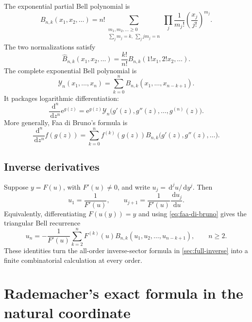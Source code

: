\documentclass[11pt]{article}
\numberwithin{equation}{section}
\theoremstyle{mainthm}
\theoremstyle{defstyle}
\theoremstyle{remark}
\newcommand{\e}{\mathrm e}
\newcommand{\dd}{\,\mathrm d}
\newcommand{\Ybell}{\mathcal Y}
\begin{document}
The exponential partial Bell polynomial is
\begin{equation}\label{eq:exp-bell-def}
 B_{n,k}(x_1,x_2,\ldots)=
 n!\sum_{\substack{m_1,m_2,\ldots\ge0\\
                 \sum_jm_j=k,\ \sum_jjm_j=n}}
 \prod_j\frac1{m_j!}\left(\frac{x_j}{j!}\right)^{m_j}.
\end{equation}
The two normalizations satisfy
\begin{equation}\label{eq:bell-normalization-relation}
 \widehat B_{n,k}(x_1,x_2,\ldots)
 =\frac{k!}{n!}B_{n,k}(1!x_1,2!x_2,\ldots).
\end{equation}
The complete exponential Bell polynomial is
\begin{equation}\label{eq:complete-bell}
 \Ybell_n(x_1,\ldots,x_n)=\sum_{k=0}^{n}B_{n,k}(x_1,\ldots,x_{n-k+1}).
\end{equation}
It packages logarithmic differentiation:
\begin{equation}\label{eq:exp-derivative-bell}
 \frac{\dd^n}{\dd z^n}\e^{g(z)}
 =\e^{g(z)}\Ybell_n\bigl(g'(z),g''(z),\ldots,g^{(n)}(z)\bigr).
\end{equation}
More generally, Faa di Bruno's formula is
\begin{equation}\label{eq:faa-di-bruno}
 \frac{\dd^n}{\dd z^n}f(g(z))
 =\sum_{k=0}^{n}f^{(k)}(g(z))
 B_{n,k}\bigl(g'(z),g''(z),\ldots\bigr).
\end{equation}

\subsection{Inverse derivatives}

Suppose \(y=F(u)\), with \(F'(u)\ne0\), and write \(u_j=\dd^ju/\dd y^j\).  Then
\begin{equation}\label{eq:inverse-derivative-operator}
 u_1=\frac1{F'(u)},\qquad
 u_{j+1}=\frac1{F'(u)}\frac{\dd u_j}{\dd u}.
\end{equation}
Equivalently, differentiating \(F(u(y))=y\) and using \eqref{eq:faa-di-bruno} gives the triangular Bell recurrence
\begin{equation}\label{eq:inverse-derivative-bell}
 u_n=-\frac1{F'(u)}
 \sum_{k=2}^{n}F^{(k)}(u)
 B_{n,k}(u_1,u_2,\ldots,u_{n-k+1}),
 \qquad n\ge2.
\end{equation}
These identities turn the all-order inverse-sector formula in \cref{sec:full-inverse} into a finite combinatorial calculation at every order.

\section{Rademacher's exact formula in the natural coordinate}\label{sec:rademacher}
\end{document}

